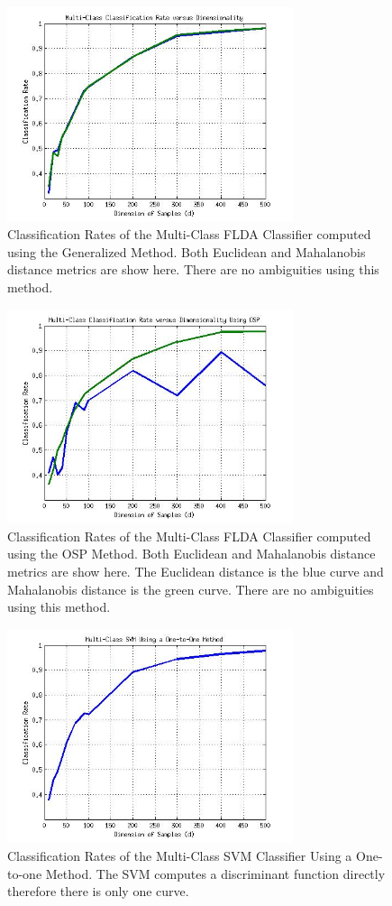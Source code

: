 \documentclass[journal]{IEEEtran}
\begin{document}
\begin{figure}[!h]
\centering
\includegraphics[width=3.3in]{../images/multi_gen_rate.jpg}
\caption{Classification Rates of the Multi-Class FLDA Classifier computed using the Generalized Method. Both Euclidean and Mahalanobis distance metrics are show here. There are no ambiguities using this method.}
\label{fig:multi_gen_rate}
\end{figure}

\begin{figure}[!h]
\centering
\includegraphics[width=3.3in]{../images/multi_osp_rate.jpg}
\caption{Classification Rates of the Multi-Class FLDA Classifier computed using the OSP Method. Both Euclidean and Mahalanobis distance metrics are show here. The Euclidean distance is the blue curve and Mahalanobis distance is the green curve. There are no ambiguities using this method.}
\label{fig:multi_gen_rate}
\end{figure}

\begin{figure}[!h]
\centering
\includegraphics[width=3.3in]{../images/one2one_rate_svm.jpg}
\caption{Classification Rates of the Multi-Class SVM Classifier Using a One-to-one Method. The SVM computes a discriminant function directly therefore there is only one curve.}
\label{fig:multi_svm_rate}
\end{figure}
\end{document}
